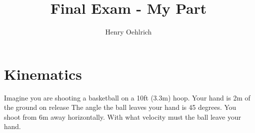 \documentclass{article}
\title{Final Exam - My Part}
\author{Henry Oehlrich}
\begin{document}
\maketitle{}
\section{Kinematics}
Imagine you are shooting a basketball on a 10ft (3.3m) hoop. Your hand is 2m of
the ground on release The angle the ball leaves your hand is 45 degrees. You
shoot from 6m away horizontally. With what velocity must the ball leave your
hand.
\end{document}
